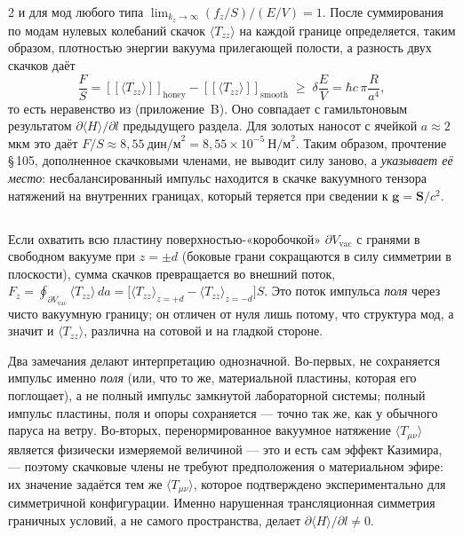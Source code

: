\documentclass[twoside, 10pt]{article}
\def\myvspacebeforesubsection{-2.0mm}
\def\myvspaceaftersubsection{-2.5mm}
\begin{document}
\begin{multicols}{2}
и для мод любого типа $\lim_{k_z\to\infty}(f_z/S)/(E/V)=1$. После суммирования по
модам нулевых колебаний скачок $\langle T_{zz}\rangle$ на каждой границе
определяется, таким образом, плотностью энергии вакуума прилегающей полости, а
разность двух скачков даёт
\[
\frac{F}{S}=[\![\langle T_{zz}\rangle]\!]_{\mathrm{honey}}-[\![\langle T_{zz}\rangle]\!]_{\mathrm{smooth}}
\;\ge\;\delta\frac{E}{V}=\hbar c\,\pi\frac{R}{a^4},
\]
то есть неравенство из \cite{Drozdov2024} (приложение~B). Оно совпадает с
гамильтоновым результатом $\partial\langle H\rangle/\partial l$ предыдущего раздела.
Для золотых наносот с ячейкой $a\approx 2~$мкм это даёт
$F/S\approx 8{,}55~\text{дин/м}^2 = 8{,}55\times10^{-5}~\text{Н/м}^2$.
Таким образом, прочтение \S\,105, дополненное скачковыми членами, не выводит силу
заново, а \emph{указывает её место}: несбалансированный импульс находится в скачке
вакуумного тензора натяжений на внутренних границах, который теряется при сведении
к $\mathbf{g}=\mathbf{S}/c^2$.

\vspace{\myvspacebeforesubsection}
\subsection*{}
\vspace{\myvspaceaftersubsection}

Если охватить всю пластину поверхностью-«коробочкой» $\partial V_{\mathrm{vac}}$ с
гранями в свободном вакууме при $z=\pm d$ (боковые грани сокращаются в силу симметрии
в плоскости), сумма скачков превращается во внешний поток,
$F_z=\oint_{\partial V_{\mathrm{vac}}}\langle T_{zz}\rangle\,da
=\big[\langle T_{zz}\rangle_{z=+d}-\langle T_{zz}\rangle_{z=-d}\big]S$.
Это поток импульса \emph{поля} через чисто вакуумную границу; он отличен от нуля лишь
потому, что структура мод, а значит и $\langle T_{zz}\rangle$, различна на сотовой и
на гладкой стороне.

Два замечания делают интерпретацию однозначной.
Во-первых, не сохраняется импульс именно \emph{поля} (или, что то же, материальной
пластины, которая его поглощает), а не полный импульс замкнутой лабораторной системы;
полный импульс пластины, поля и опоры сохраняется --- точно так же, как у обычного
паруса на ветру. Во-вторых, перенормированное вакуумное натяжение
$\langle T_{\mu\nu}\rangle$ является физически измеряемой величиной --- это и есть
сам эффект Казимира, --- поэтому скачковые члены не требуют предположения о
материальном эфире: их значение задаётся тем же $\langle T_{\mu\nu}\rangle$, которое
подтверждено экспериментально для симметричной конфигурации. Именно нарушенная
трансляционная симметрия граничных условий, а не самого пространства, делает
$\partial\langle H\rangle/\partial l\neq 0$.




\end{multicols}
\end{document}
